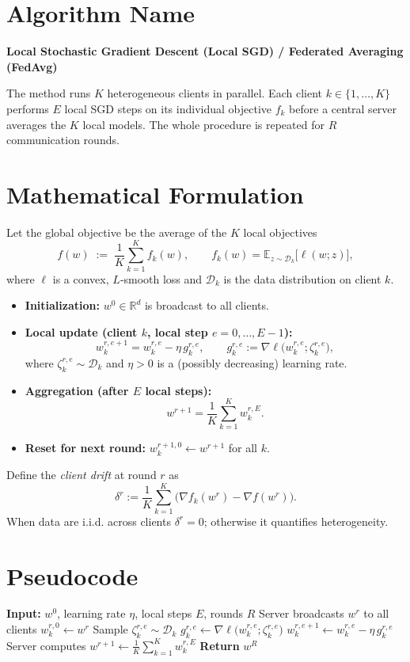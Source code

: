 \documentclass{article}
\newcommand{\E}{\mathbb{E}}
\newcommand{\grad}{\nabla}
\begin{document}
\section*{Algorithm Name}
\textbf{Local Stochastic Gradient Descent (Local SGD) / Federated Averaging (FedAvg)}  

The method runs $K$ heterogeneous clients in parallel.  
Each client $k\in\{1,\dots,K\}$ performs $E$ local SGD steps on its
individual objective $f_k$ before a central server averages the $K$ local
models.  The whole procedure is repeated for $R$ communication rounds.

\section*{Mathematical Formulation}
Let the global objective be the average of the $K$ local objectives
\[
f(w)\;:=\;\frac1K\sum_{k=1}^{K} f_k(w),\qquad 
f_k(w)=\E_{z\sim\mathcal D_k}\big[\ell(w;z)\big],
\]
where $\ell$ is a convex, $L$‑smooth loss and $\mathcal D_k$ is the data
distribution on client $k$.

\begin{itemize}
\item \textbf{Initialization:} $w^{0}\in\mathbb R^{d}$ is broadcast to all clients.
\item \textbf{Local update (client $k$, local step $e=0,\dots,E-1$):}
\[
w_{k}^{r,e+1}=w_{k}^{r,e}-\eta\, g_{k}^{r,e},
\qquad
g_{k}^{r,e}:=\grad\ell\big(w_{k}^{r,e};\zeta_{k}^{r,e}\big),
\]
where $\zeta_{k}^{r,e}\sim\mathcal D_k$ and $\eta>0$ is a (possibly
decreasing) learning rate.
\item \textbf{Aggregation (after $E$ local steps):}
\[
w^{r+1}= \frac1K\sum_{k=1}^{K} w_{k}^{r,E}.
\]
\item \textbf{Reset for next round:} $w_{k}^{r+1,0}\gets w^{r+1}$ for all $k$.
\end{itemize}
Define the \emph{client drift} at round $r$ as
\[
\delta^{r}:=\frac1K\sum_{k=1}^{K}\big(\grad f_k(w^{r})-\grad f(w^{r})\big).
\]
When data are i.i.d. across clients $\delta^{r}=0$; otherwise it quantifies
heterogeneity.

\section*{Pseudocode}
\begin{algorithm}[H]
\caption{Local SGD (FedAvg)}
\begin{algorithmic}[1]
\State \textbf{Input:} $w^{0}$, learning rate $\eta$, local steps $E$, rounds $R$
    \State Server broadcasts $w^{r}$ to all clients
        \State $w_{k}^{r,0}\gets w^{r}$
            \State Sample $\zeta_{k}^{r,e}\sim\mathcal D_k$
            \State $g_{k}^{r,e}\gets\grad\ell\big(w_{k}^{r,e};\zeta_{k}^{r,e}\big)$
            \State $w_{k}^{r,e+1}\gets w_{k}^{r,e}-\eta\, g_{k}^{r,e}$
        \EndFor
    \EndFor
    \State Server computes $w^{r+1}\gets \frac1K\sum_{k=1}^{K} w_{k}^{r,E}$
\EndFor
\State \textbf{Return} $w^{R}$
\end{algorithmic}
\end{algorithm}
\end{document}
